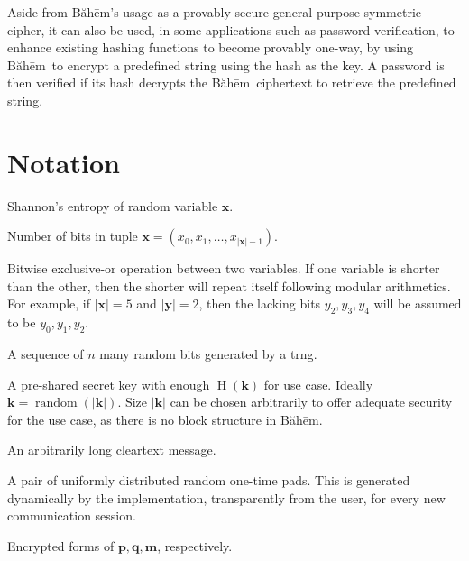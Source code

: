 \documentclass[twocolumn,hidelinks]{article}
\newcommand{\baheem}{Băhēm}
\DeclareMathOperator{\random}{random}
\DeclareMathOperator{\entropy}{H}
\begin{document}
Aside from \baheem's usage as a provably-secure general-purpose symmetric
cipher, it can also be used, in some applications such as password
verification, to enhance existing hashing functions to become provably
one-way, by using \baheem\ to encrypt a predefined string using the hash as
the key.  A password is then verified if its hash decrypts the \baheem\
ciphertext to retrieve the predefined string.

\section*{Notation}
\begin{description}[itemsep=0em]
    \item[$\entropy(\mathbf{x})$] Shannon's entropy of random variable
        $\mathbf{x}$.
    \item[$|\mathbf{x}|$] Number of bits in tuple $\mathbf{x} = (x_0, x_1,
        \ldots, x_{|\mathbf{x}|-1})$.
    \item[$\mathbf{x} \oplus \mathbf{y}$] Bitwise exclusive-or operation
        between two variables.  If one variable is shorter than the other,
        then the shorter will repeat itself following modular arithmetics.
        For example, if $|\mathbf{x}| = 5$ and $|\mathbf{y}|=2$, then the
        lacking bits $y_2, y_3, y_4$ will be assumed to be $y_0, y_1, y_2$.
    \item[$\random(n) = (r_0, r_1, \ldots, r_n)$] A sequence of $n$ many
        random bits generated by a \gls{trng}.
    \item[$\mathbf{k} = (k_0, k_1, \ldots, k_{|\mathbf{k}|-1})$] A
        pre-shared secret key with enough $\entropy(\mathbf{k})$ for use
        case.  Ideally $\mathbf{k} = \random(|\mathbf{k}|)$.  Size
        $|\mathbf{k}|$ can be chosen arbitrarily to offer adequate security
        for the use case, as there is no block structure in \baheem.
    \item[$\mathbf{m} = (m_0, m_1, \ldots, m_{|\mathbf{m}|-1})$] An
        arbitrarily long cleartext message.
    \item[$\mathbf{p} = \random(|\mathbf{m}|), \mathbf{q} =
        \random(|\mathbf{m}|)$] A pair of uniformly distributed random
        one-time pads.  This is generated dynamically by the
        implementation, transparently from the user, for every new
        communication session.
    \item[$\mathbf{\hat p}, \mathbf{\hat q}, \mathbf{\hat m}$] Encrypted
        forms of $\mathbf{p}, \mathbf{q}, \mathbf{m}$, respectively.
\end{description}
\end{document}
